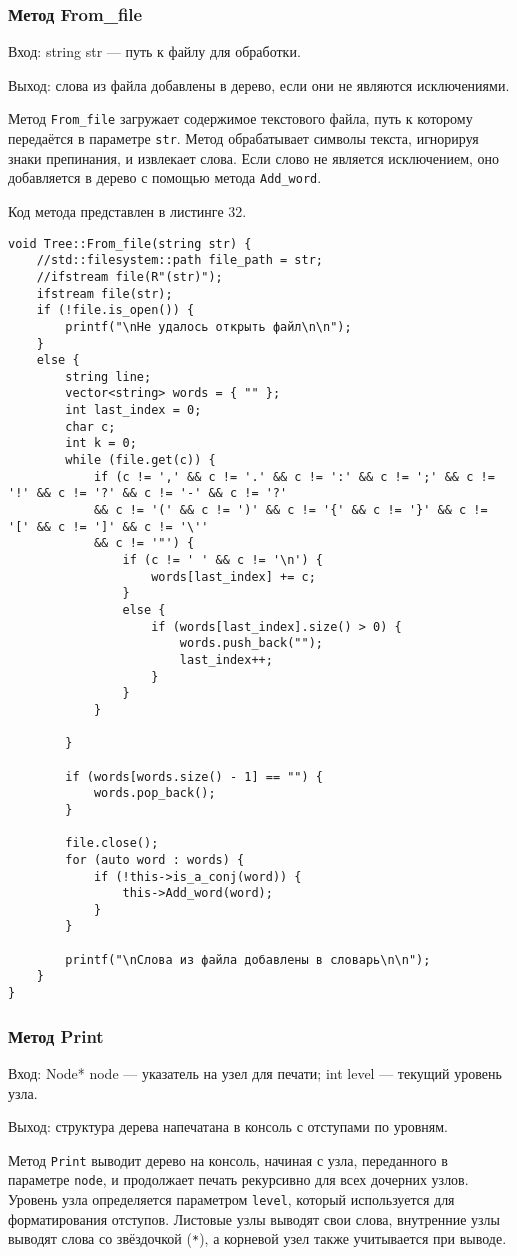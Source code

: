 \documentclass[10pt,a4paper,final]{article} %
\begin{document}
\subsubsection{Метод From\_file}
Вход: string str — путь к файлу для обработки. \par
Выход: слова из файла добавлены в дерево, если они не являются исключениями. \par
\par Метод \texttt{From\_file} загружает содержимое текстового файла, путь к которому передаётся в параметре \texttt{str}. Метод обрабатывает символы текста, игнорируя знаки препинания, и извлекает слова. Если слово не является исключением, оно добавляется в дерево с помощью метода \texttt{Add\_word}.

Код метода представлен в листинге 32. \begin{lstlisting}[label=fromFileMethod, caption = Метод From\_file для класса Tree] 
void Tree::From_file(string str) {
	//std::filesystem::path file_path = str;
	//ifstream file(R"(str)");
	ifstream file(str);
	if (!file.is_open()) {
		printf("\nНе удалось открыть файл\n\n");
	}
	else {
		string line;
		vector<string> words = { "" };
		int last_index = 0;
		char c;
		int k = 0;
		while (file.get(c)) {
			if (c != ',' && c != '.' && c != ':' && c != ';' && c != '!' && c != '?' && c != '-' && c != '?'
			&& c != '(' && c != ')' && c != '{' && c != '}' && c != '[' && c != ']' && c != '\''
			&& c != '"') {
				if (c != ' ' && c != '\n') {
					words[last_index] += c;
				}
				else {
					if (words[last_index].size() > 0) {
						words.push_back("");
						last_index++;
					}
				}
			}
			
		}
		
		if (words[words.size() - 1] == "") {
			words.pop_back();
		}
		
		file.close();
		for (auto word : words) {
			if (!this->is_a_conj(word)) {
				this->Add_word(word);
			}
		}
		
		printf("\nСлова из файла добавлены в словарь\n\n");
	}
}\end{lstlisting}



\subsubsection{Метод Print}
Вход: Node* node — указатель на узел для печати; int level — текущий уровень узла. \par
Выход: структура дерева напечатана в консоль с отступами по уровням. \par
\par Метод \texttt{Print} выводит дерево на консоль, начиная с узла, переданного в параметре \texttt{node}, и продолжает печать рекурсивно для всех дочерних узлов. Уровень узла определяется параметром \texttt{level}, который используется для форматирования отступов. Листовые узлы выводят свои слова, внутренние узлы выводят слова со звёздочкой (\texttt{*}), а корневой узел также учитывается при выводе.
\end{document}
